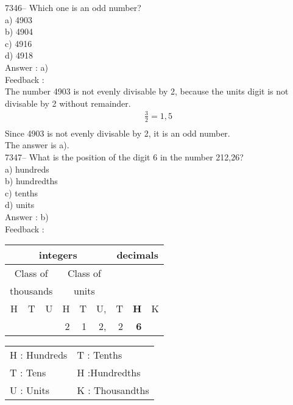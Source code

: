 \documentclass[letterpaper, 12pt]{article}
\begin{document}
7346-- Which one is an odd number?\\

a) 4903\\
b) 4904\\
c) 4916\\
d) 4918\\

Answer : a)\\

Feedback :\\
The number 4903 is not evenly divisable by 2, because the units digit is not divisable by 2 without remainder.\\
\begin{eqnarray*}
\frac{3}{2}=1,5\\
\end{eqnarray*}
Since 4903 is not evenly divisable by 2, it is an odd number.\\
The answer is a).\\

7347-- What is the position of the digit 6 in the number 212,26?\\

a) hundreds\\
b) hundredths\\
c) tenths\\
d) units\\

Answer : b)\\

Feedback :\\
\begin{center}
\begin{tabular}{|rrr|rrr|rrr|}
\hline
\multicolumn{6}{|c|}{integers} &\multicolumn{3}{|c|}{decimals} \\
\hline
\multicolumn{3}{|c|}{Class of} &\multicolumn{3}{|c|}{Class of} &  \multicolumn{3}{c|}{} \\
\multicolumn{3}{|c|}{thousands} &\multicolumn{3}{|c|}{units} &  \multicolumn{3}{c|}{} \\
\hline
H & T & U &H & T & U, & T\up{th} & \textbf{H\up{th}} & K\up{th} \\
\hline
\hline
& & & 2 & 1 & 2, & 2 & \textbf{6} &  \\
\hline
\end{tabular}
\end{center}

\scriptsize
\begin{center}
\begin{tabular}{ll}
H : Hundreds & T\up{th} : Tenths\\
T : Tens & H\up{th} :Hundredths\\
U : Units & K\up{e} : Thousandths\\
\end{tabular}
\end{center}
\end{document}
